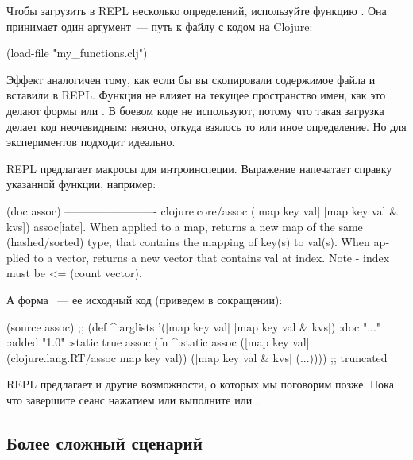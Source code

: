 Чтобы загрузить в REPL несколько определений, используйте функцию . Она принимает один аргумент~--- путь к файлу с кодом на Clojure:

\begin{english}
  \begin{clojure}
(load-file "my_functions.clj")
  \end{clojure}
\end{english}

Эффект аналогичен тому, как если бы вы скопировали содержимое файла и вставили в REPL. Функция не влияет на текущее пространство имен, как это делают формы  или . В боевом коде  не используют, потому что такая загрузка делает код неочевидным: неясно, откуда взялось то или иное определение. Но для экспериментов  подходит идеально.

REPL предлагает макросы для интроинспеции. Выражение  напечатает справку указанной функции, например:

\begin{english}
  \begin{text}
(doc assoc)
-------------------------
clojure.core/assoc
([map key val] [map key val & kvs])
  assoc[iate]. When applied to a map, returns a new map of the
    same (hashed/sorted) type, that contains the mapping of key(s) to
    val(s). When applied to a vector, returns a new vector that
    contains val at index. Note - index must be <= (count vector).
  \end{text}
\end{english}

А форма ~--- ее исходный код (приведем в сокращении):

\begin{english}
  \begin{clojure}
(source assoc)
;;
(def
 ^{:arglists '([map key val] [map key val & kvs])
   :doc "..."
   :added "1.0"
   :static true}
 assoc
 (fn ^:static assoc
   ([map key val] (clojure.lang.RT/assoc map key val))
   ([map key val & kvs]
    (...)))) ;; truncated
  \end{clojure}
\end{english}

REPL предлагает и другие возможности, о которых мы поговорим позже. Пока что завершите сеанс нажатием  или выполните  или .

\subsection{Более сложный сценарий}

